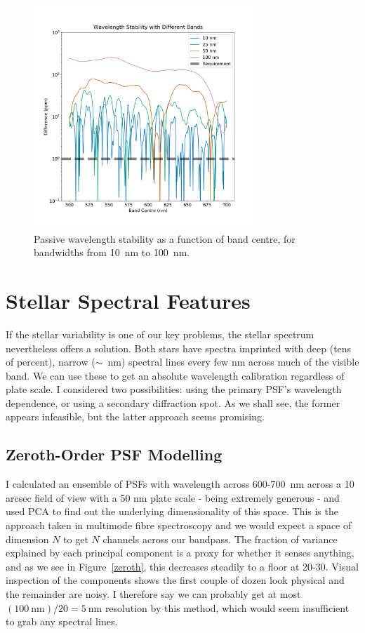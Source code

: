 \documentclass[a4paper,12pt]{article}
\begin{document}
\begin{figure}
\centering
\includegraphics[width=0.75\textwidth]{bands.png}
\caption{Passive wavelength stability as a function of band centre, for bandwidths from 10~nm to 100~nm.}
\label{stability}
\end{figure}

\section{Stellar Spectral Features}

If the stellar variability is one of our key problems, the stellar spectrum nevertheless offers a solution. Both stars have spectra imprinted with deep (tens of percent), narrow ($\sim$~nm) spectral lines every few nm across much of the visible band. We can use these to get an absolute wavelength calibration regardless of plate scale. I considered two possibilities: using the primary PSF's wavelength dependence, or using a secondary diffraction spot. As we shall see, the former appears infeasible, but the latter approach seems promising.

\subsection{Zeroth-Order PSF Modelling}

I calculated an ensemble of PSFs with wavelength across 600-700~nm across a 10 arcsec field of view with a 50 nm plate scale - being extremely generous - and used PCA to find out the underlying dimensionality of this space. This is the approach taken in multimode fibre spectroscopy and we would expect a space of dimension $N$ to get $N$ channels across our bandpass. The fraction of variance explained by each principal component is a proxy for whether it senses anything, and as we see in Figure~\ref{zeroth}, this decreases steadily to a floor at 20-30. Visual inspection of the components shows the first couple of dozen look physical and the remainder are noisy. I therefore say we can probably get at most $(100~\text{nm})/20 = 5~\text{nm}$ resolution by this method, which would seem insufficient to grab any spectral lines. 
\end{document}
